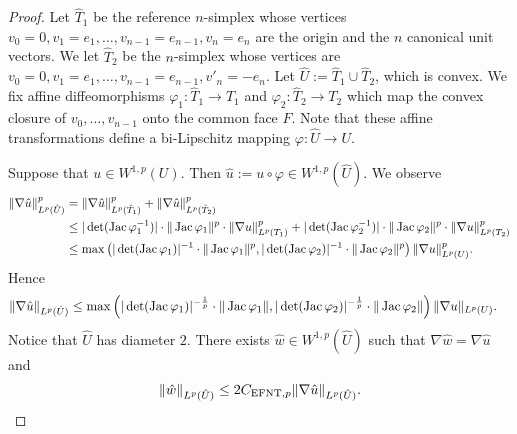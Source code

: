 \documentclass[12pt,a4paper]{article}
\begin{document}
\begin{proof}
    Let $\hat T_1$ be the reference $n$-simplex whose vertices $v_0=0, v_1=e_1, \dots, v_{n-1} = e_{n-1}, v_n = e_n$ are the origin and the $n$ canonical unit vectors. 
    We let $\hat T_2$ be the $n$-simplex whose vertices are $v_0=0, v_1=e_1, \dots, v_{n-1} = e_{n-1}, v'_n = -e_n$. 
    Let $\hat U := \hat T_1 \cup \hat T_2$, which is convex. 
    We fix affine diffeomorphisms $\varphi_1 : \hat T_1 \rightarrow T_1$ and $\varphi_2 : \hat T_2 \rightarrow T_2$
    which map the convex closure of $v_0, \dots, v_{n-1}$ onto the common face $F$.
    Note that these affine transformations define a bi-Lipschitz mapping $\varphi : \hat U \rightarrow U$. 
    
    Suppose that $u \in W^{1,p}(U)$. Then $\hat u := u \circ \varphi \in W^{1,p}(\hat U)$. 
    We observe 
    \begin{align*}
        \| \nabla \hat u \|_{L^{p}(\hat U)}^{p}
        &=
        \| \nabla \hat u \|_{L^{p}(\hat T_1)}^{p}
        +
        \| \nabla \hat u \|_{L^{p}(\hat T_2)}^{p}
        \\&
        \leq 
        |\det(\operatorname{{\rm Jac}} \varphi_1^{-1})|
        \cdot \| \operatorname{{\rm Jac}} \varphi_1 \|^{p}
        \cdot 
        \| \nabla u \|_{L^{p}(T_1)}^{p}
        +
        |\det(\operatorname{{\rm Jac}} \varphi_2^{-1})|
        \cdot \| \operatorname{{\rm Jac}} \varphi_2 \|^{p}
        \cdot 
        \| \nabla u \|_{L^{p}(T_2)}^{p}
        \\&
        \leq 
        \max\left( 
            |\det(\operatorname{{\rm Jac}} \varphi_1)|^{-1} \cdot \| \operatorname{{\rm Jac}} \varphi_1 \|^{p}
            ,
            |\det(\operatorname{{\rm Jac}} \varphi_2)|^{-1} \cdot \| \operatorname{{\rm Jac}} \varphi_2 \|^{p}
        \right)
        \| \nabla u \|_{L^{p}(U)}^{p}
        .
    \end{align*}
    Hence 
    \begin{align*}
        \| \nabla \hat u \|_{L^{p}(\hat U)}
        &\leq 
        \max\left( 
            |\det(\operatorname{{\rm Jac}} \varphi_1)|^{-\frac 1 p} \cdot \| \operatorname{{\rm Jac}} \varphi_1 \|
            ,
            |\det(\operatorname{{\rm Jac}} \varphi_2)|^{-\frac 1 p} \cdot \| \operatorname{{\rm Jac}} \varphi_2 \|
        \right)
        \| \nabla u \|_{L^{p}(U)}
        .
    \end{align*}
    Notice that $\hat U$ has diameter $2$. 
    There exists $\hat w \in W^{1,p}(\hat U)$ such that $\nabla \hat w = \nabla \hat u$ and 
    \begin{align*}
        \| \hat w \|_{L^{p}(\hat U)}
        \leq 
        2 C_{{\rm EFNT},p}
        \| \nabla \hat u \|_{L^{p}(\hat U)}
        .

\end{align*}
\end{proof}
\end{document}
